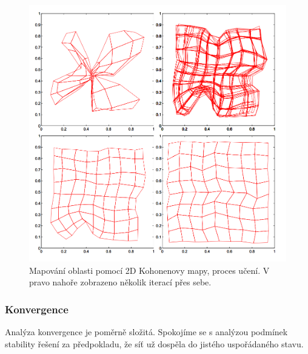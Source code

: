 \documentclass[11pt]{report} %
\numberwithin{equation}{section}
\begin{document}
\begin{figure}[h]
	\centering
	\includegraphics[scale=1]{img/kohonen_square.png}
	\caption{Mapování oblasti pomocí 2D Kohonenovy mapy, proces učení. V pravo nahoře zobrazeno několik iterací přes sebe.}
\end{figure}

\subsubsection{Konvergence}
Analýza konvergence je poměrně složitá. Spokojíme se s analýzou podmínek stability řešení za předpokladu, že síť už dospěla do jistého uspořádaného stavu.
\end{document}

